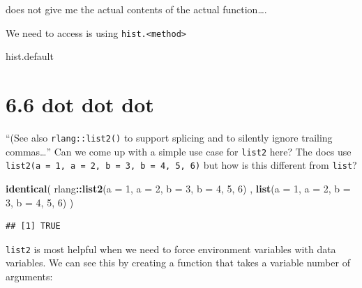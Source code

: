\documentclass[]{book}
\newenvironment{Shaded}{\begin{snugshade}}{\end{snugshade}}
\newcommand{\DataTypeTok}[1]{\textcolor[rgb]{0.13,0.29,0.53}{#1}}
\newcommand{\DecValTok}[1]{\textcolor[rgb]{0.00,0.00,0.81}{#1}}
\newcommand{\KeywordTok}[1]{\textcolor[rgb]{0.13,0.29,0.53}{\textbf{#1}}}
\newcommand{\NormalTok}[1]{#1}
\newcommand{\OperatorTok}[1]{\textcolor[rgb]{0.81,0.36,0.00}{\textbf{#1}}}
\begin{document}
does not give me the actual contents of the actual function\ldots{}.

We need to access is using \texttt{hist.\textless{}method\textgreater{}}

\begin{Shaded}
\begin{Highlighting}[]
\NormalTok{hist.default}
\end{Highlighting}
\end{Shaded}

\hypertarget{dot-dot-dot}{%
\section*{6.6 dot dot dot}\label{dot-dot-dot}}

``(See also \texttt{rlang::list2()} to support splicing and to silently ignore trailing commas\ldots{}'' Can we come up with a simple use case for \texttt{list2} here? The docs use \texttt{list2(a\ =\ 1,\ a\ =\ 2,\ b\ =\ 3,\ b\ =\ 4,\ 5,\ 6)} but how is this different from \texttt{list}?

\begin{Shaded}
\begin{Highlighting}[]
\KeywordTok{identical}\NormalTok{(}
\NormalTok{  rlang}\OperatorTok{::}\KeywordTok{list2}\NormalTok{(}\DataTypeTok{a =} \DecValTok{1}\NormalTok{, }\DataTypeTok{a =} \DecValTok{2}\NormalTok{, }\DataTypeTok{b =} \DecValTok{3}\NormalTok{, }\DataTypeTok{b =} \DecValTok{4}\NormalTok{, }\DecValTok{5}\NormalTok{, }\DecValTok{6}\NormalTok{) ,}
  \KeywordTok{list}\NormalTok{(}\DataTypeTok{a =} \DecValTok{1}\NormalTok{, }\DataTypeTok{a =} \DecValTok{2}\NormalTok{, }\DataTypeTok{b =} \DecValTok{3}\NormalTok{, }\DataTypeTok{b =} \DecValTok{4}\NormalTok{, }\DecValTok{5}\NormalTok{, }\DecValTok{6}\NormalTok{)}
\NormalTok{)}
\end{Highlighting}
\end{Shaded}

\begin{verbatim}
## [1] TRUE
\end{verbatim}

\texttt{list2} is most helpful when we need to force environment variables with data variables. We can see this by creating a function that takes a variable number of arguments:
\end{document}
